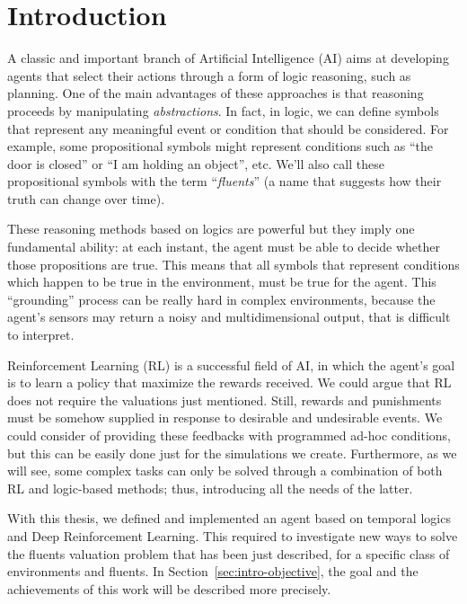 \chapter{Introduction}

A classic and important branch of Artificial Intelligence (AI) aims at
developing agents that select their actions through a form of logic reasoning,
such as planning. One of the main advantages of these approaches is that
reasoning proceeds by manipulating \emph{abstractions}. In fact, in logic,
we can define symbols that represent any meaningful event or condition that
should be considered. For example, some propositional symbols might represent
conditions such as ``the door is closed'' or ``I am holding an object'', etc.
We'll also call these propositional symbols with the term ``\emph{fluents}''
(a name that suggests how their truth can change over time).

These reasoning methods based on logics are powerful but they imply one
fundamental ability: at each instant, the agent must be able to decide whether
those propositions are true. This means that all symbols that represent
conditions which happen to be true in the environment, must be true for the
agent. This ``grounding'' process can be really hard in complex environments,
because the agent's sensors may return a noisy and multidimensional output,
that is difficult to interpret.

Reinforcement Learning (RL) is a successful field of AI, in which the
agent's goal is to learn a policy that maximize the rewards received.  We
could argue that RL does not require the valuations just mentioned. Still,
rewards and punishments must be somehow supplied in response to desirable and
undesirable events. We could consider of providing these feedbacks with
programmed ad-hoc conditions, but this can be easily done just for the
simulations we create. Furthermore, as we will see, some complex tasks can
only be solved through a combination of both RL and logic-based methods; thus,
introducing all the needs of the latter.

With this thesis, we defined and implemented an agent based on temporal logics
and Deep Reinforcement Learning. This required to investigate new ways to
solve the fluents valuation problem that has been just described, for a
specific class of environments and fluents. In
Section~\ref{sec:intro-objective}, the goal and the achievements of this work
will be described more precisely.


